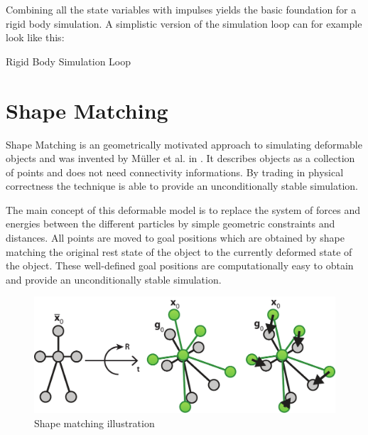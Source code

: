 Combining all the state variables with impulses yields the basic foundation for a rigid body simulation. A simplistic version of the simulation loop can for example look like this:

\begin{algorithm}[htb]
\caption{Rigid Body Simulation Loop}
\begin{algorithmic}[1]
\ENDFOR
{}
	\ENDFOR
\ENDFOR
{}
\ENDFOR
{}
\ENDFOR
\end{algorithmic}
\end{algorithm}

\section{Shape Matching}
\label{sec:shape_matching}

Shape Matching is an geometrically motivated approach to simulating deformable objects and was invented by M{\"u}ller et al. in \cite{Muller:2005fi}. It describes objects as a collection of points and does not need connectivity informations. By trading in physical correctness the technique is able to provide an unconditionally stable simulation. 

The main concept of this deformable model is to replace the system of forces and energies between the different particles by simple geometric constraints and distances. All points are moved to goal positions which are obtained by shape matching the original rest state of the object to the currently deformed state of the object. These well-defined goal positions are computationally easy to obtain and provide an unconditionally stable simulation.

\begin{figure}[h]
\centering
\includegraphics[width=.96\textwidth]{images/shape_matching.pdf}
\caption{Shape matching illustration}
\label{img:shape_matching}
\end{figure}

